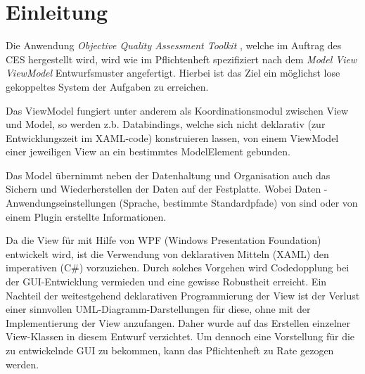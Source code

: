 \chapter{Einleitung}

Die Anwendung \emph{Objective Quality Assessment Toolkit} , welche im Auftrag des CES hergestellt wird, wird wie im Pflichtenheft spezifiziert nach dem \emph{Model View ViewModel} Entwurfsmuster angefertigt.
Hierbei ist das Ziel ein möglichst lose gekoppeltes System der Aufgaben zu erreichen.

Das ViewModel fungiert unter anderem als Koordinationsmodul
zwischen View und Model, so werden z.b. Databindings, welche
sich nicht deklarativ (zur Entwicklungszeit im XAML-code)
konstruieren lassen, von einem ViewModel einer jeweiligen View
an ein bestimmtes ModelElement gebunden.

Das Model übernimmt neben der Datenhaltung und Organisation
auch das Sichern und Wiederherstellen der Daten auf der Festplatte.
Wobei Daten \projektTitel-Anwendungseinstellungen (Sprache, bestimmte
Standardpfade) von \projektTitel sind oder von einem Plugin erstellte Informationen.

Da die View für \projektTitel mit Hilfe von WPF (Windows Presentation Foundation) entwickelt 
wird, ist die Verwendung von deklarativen Mitteln (XAML) den
imperativen (C#) vorzuziehen. Durch solches Vorgehen wird
Codedopplung bei der GUI-Entwicklung vermieden und eine
gewisse Robustheit erreicht. Ein Nachteil der weitestgehend deklarativen
Programmierung der View ist der Verlust einer sinnvollen
UML-Diagramm-Darstellungen für diese, ohne mit der Implementierung 
der View anzufangen. Daher wurde auf das Erstellen einzelner View-Klassen in diesem Entwurf
verzichtet. Um dennoch eine Vorstellung für die zu entwickelnde GUI 
zu bekommen, kann das Pflichtenheft zu Rate gezogen werden.
